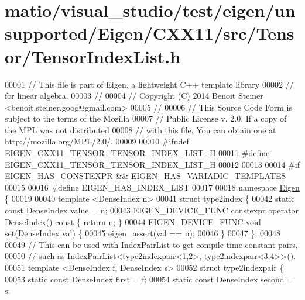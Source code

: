\hypertarget{matio_2visual__studio_2test_2eigen_2unsupported_2_eigen_2_c_x_x11_2src_2_tensor_2_tensor_index_list_8h_source}{}\section{matio/visual\+\_\+studio/test/eigen/unsupported/\+Eigen/\+C\+X\+X11/src/\+Tensor/\+Tensor\+Index\+List.h}
\label{matio_2visual__studio_2test_2eigen_2unsupported_2_eigen_2_c_x_x11_2src_2_tensor_2_tensor_index_list_8h_source}

\begin{DoxyCode}
00001 \textcolor{comment}{// This file is part of Eigen, a lightweight C++ template library}
00002 \textcolor{comment}{// for linear algebra.}
00003 \textcolor{comment}{//}
00004 \textcolor{comment}{// Copyright (C) 2014 Benoit Steiner <benoit.steiner.goog@gmail.com>}
00005 \textcolor{comment}{//}
00006 \textcolor{comment}{// This Source Code Form is subject to the terms of the Mozilla}
00007 \textcolor{comment}{// Public License v. 2.0. If a copy of the MPL was not distributed}
00008 \textcolor{comment}{// with this file, You can obtain one at http://mozilla.org/MPL/2.0/.}
00009 
00010 \textcolor{preprocessor}{#ifndef EIGEN\_CXX11\_TENSOR\_TENSOR\_INDEX\_LIST\_H}
00011 \textcolor{preprocessor}{#define EIGEN\_CXX11\_TENSOR\_TENSOR\_INDEX\_LIST\_H}
00012 
00013 
00014 \textcolor{preprocessor}{#if EIGEN\_HAS\_CONSTEXPR && EIGEN\_HAS\_VARIADIC\_TEMPLATES}
00015 
00016 \textcolor{preprocessor}{#define EIGEN\_HAS\_INDEX\_LIST}
00017 
00018 \textcolor{keyword}{namespace }\hyperlink{namespace_eigen}{Eigen} \{
00019 
00040 \textcolor{keyword}{template} <DenseIndex n>
00041 \textcolor{keyword}{struct }type2index \{
00042   \textcolor{keyword}{static} \textcolor{keyword}{const} DenseIndex value = n;
00043   EIGEN\_DEVICE\_FUNC constexpr \textcolor{keyword}{operator} DenseIndex()\textcolor{keyword}{ const }\{ \textcolor{keywordflow}{return} n; \}
00044   EIGEN\_DEVICE\_FUNC \textcolor{keywordtype}{void} \textcolor{keyword}{set}(DenseIndex val) \{
00045     eigen\_assert(val == n);
00046   \}
00047 \};
00048 
00049 \textcolor{comment}{// This can be used with IndexPairList to get compile-time constant pairs,}
00050 \textcolor{comment}{// such as IndexPairList<type2indexpair<1,2>, type2indexpair<3,4>>().}
00051 \textcolor{keyword}{template} <DenseIndex f, DenseIndex s>
00052 \textcolor{keyword}{struct }type2indexpair \{
00053   \textcolor{keyword}{static} \textcolor{keyword}{const} DenseIndex first = f;
00054   \textcolor{keyword}{static} \textcolor{keyword}{const} DenseIndex second = s;

\end{DoxyCode}
